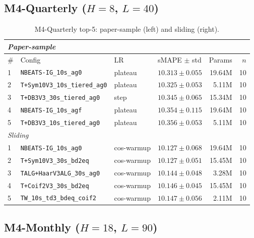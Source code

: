 \documentclass{article}
\begin{document}
\subsection{\texorpdfstring{M4-Quarterly ($H=8$, $L=40$)}{M4-Quarterly (H=8, L=40)}}

\begin{table}[h]
\centering
\scriptsize
\setlength{\tabcolsep}{2.5pt}
\caption{M4-Quarterly top-5: paper-sample (left) and sliding (right).}
\label{tab:m4_quarterly_full}
\begin{tabular}{@{}llllrr@{}}
\toprule
\multicolumn{6}{l}{\textit{Paper-sample}} \\
\midrule
\# & Config & LR & sMAPE $\pm$ std & Params & $n$ \\
\midrule
1 & \texttt{NBEATS-IG\_10s\_ag0}            & plateau & $\mathbf{10.313 \pm 0.055}$ & 19.64M & 10 \\
2 & \texttt{T+Sym10V3\_10s\_tiered\_ag0}    & plateau & $10.325 \pm 0.053$          & 5.11M  & 10 \\
3 & \texttt{T+DB3V3\_30s\_tiered\_ag0}      & step    & $10.345 \pm 0.065$          & 15.34M & 10 \\
4 & \texttt{NBEATS-IG\_10s\_agf}            & plateau & $10.354 \pm 0.115$          & 19.64M & 10 \\
5 & \texttt{T+DB3V3\_10s\_tiered\_ag0}      & plateau & $10.356 \pm 0.053$          & 5.11M  & 10 \\
\midrule
\multicolumn{6}{l}{\textit{Sliding}} \\
\midrule
1 & \texttt{NBEATS-IG\_10s\_ag0}            & cos-warmup & $\mathbf{10.127 \pm 0.068}$ & 19.64M & 10 \\
2 & \texttt{T+Sym10V3\_30s\_bd2eq}          & cos-warmup & $10.127 \pm 0.051$          & 15.45M & 10 \\
3 & \texttt{TALG+HaarV3ALG\_30s\_ag0}       & cos-warmup & $10.144 \pm 0.048$          & 3.28M  & 10 \\
4 & \texttt{T+Coif2V3\_30s\_bd2eq}          & cos-warmup & $10.146 \pm 0.045$          & 15.45M & 10 \\
5 & \texttt{TW\_10s\_td3\_bdeq\_coif2}      & cos-warmup & $10.147 \pm 0.056$          & 2.11M  & 10 \\
\bottomrule
\end{tabular}
\end{table}

\subsection{\texorpdfstring{M4-Monthly ($H=18$, $L=90$)}{M4-Monthly (H=18, L=90)}}
\end{document}
